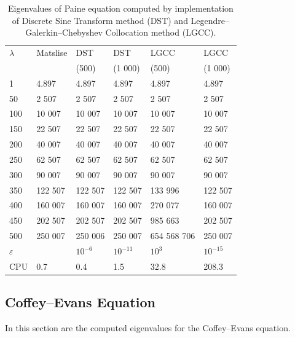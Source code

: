 \documentclass[11pt,a4paper,oneside,openright]{report} %
\begin{document}
\begin{table}[H]
\centering
\caption{Eigenvalues of Paine equation computed by implementation of Discrete Sine Transform method (DST) and Legendre--Galerkin--Chebyshev Collocation method (LGCC).}
\label{}
{\small
\begin{tabularx}{\textwidth}{l *{5}{X}}
\toprule
$\lambda$ & Matslise & DST  & DST & LGCC & LGCC \\
 &  & (500)  & (1 000) & (500) & (1 000) \\
\midrule
1 & 4.897 & 4.897 & 4.897 &  4.897 & 4.897 \\
50 & 2 507 & 2 507 & 2 507 & 2 507 & 2 507 \\
100 & 10 007 & 10 007 & 10 007 & 10 007 & 10 007 \\
150 & 22 507 & 22 507 & 22 507 & 22 507 &  22 507\\
200 & 40 007 & 40 007 & 40 007 & 40 007 & 40 007 \\
250 & 62 507 & 62 507 & 62 507 & 62 507 & 62 507\\
300 & 90 007 & 90 007 & 90 007 & 90 007 & 90 007\\
350 & 122 507 & 122 507 & 122 507 & 133 996 & 122 507\\
400 & 160 007 & 160 007 & 160 007 & 270 077 &  160 007\\
450 & 202 507 & 202 507 & 202 507 & 985 663 &  202 507\\
500 & 250 007 & 250 006 & 250 007 & 654 568 706 &  250 007\\
\midrule
$\varepsilon$ &  & $10^{-6}$ & $10^{-11}$ & $10^{3}$ & $10^{-15}$ \\
CPU & 0.7 & 0.4 & 1.5 & 32.8 & 208.3 \\
\bottomrule
\end{tabularx}
}
\end{table}


\subsection{Coffey--Evans Equation}
\noindent
In this section are the computed eigenvalues for the Coffey--Evans equation.
\end{document}
